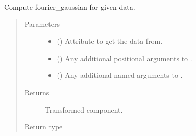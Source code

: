 \documentclass[letterpaper,10pt,english]{sphinxmanual}
\begin{document}
\begin{fulllineitems}
\begin{fulllineitems}
\label{\detokenize{api/base_classes:geology.src.base_spatial.SpatialComponent.fourier_gaussian}}
Compute fourier\_gaussian for given data.
\begin{quote}\begin{description}
\item[{Parameters}] \leavevmode\begin{itemize}
\item {} 
 (\sphinxstyleliteralemphasis{\sphinxupquote{, }}) \textendash{} Attribute to get the data from.

\item {} 
 () \textendash{} Any additional positional arguments to .

\item {} 
 () \textendash{} Any additional named arguments to .

\end{itemize}

\item[{Returns}] \leavevmode
{} \textendash{} Transformed component.

\item[{Return type}] \leavevmode
{\hyperref[\detokenize{api/base_classes:geology.src.base_spatial.SpatialComponent}]{}}

\end{description}\end{quote}

\end{fulllineitems}



\end{fulllineitems}
\end{document}
